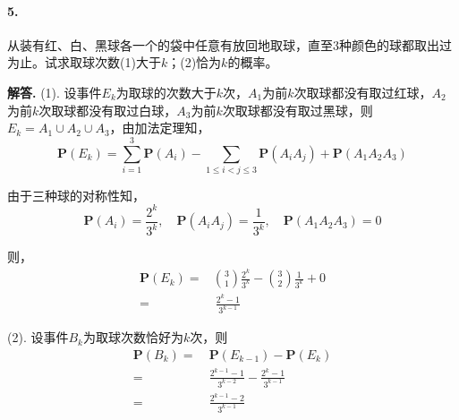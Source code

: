 \documentclass[12pt, a4paper, oneside]{ctexart}
\newenvironment{solution}{\par\noindent\textbf{解答. }}{\bigskip\par}
\begin{document}
\paragraph{5.}从装有红、白、黑球各一个的袋中任意有放回地取球，直至$3$种颜色的球都取出过为止。试求取球次数(1)大于$k$；(2)恰为$k$的概率。
\begin{solution}
    (1). 设事件$E_k$为取球的次数大于$k$次，$A_1$为前$k$次取球都没有取过红球，$A_2$为前$k$次取球都没有取过白球，$A_3$为前$k$次取球都没有取过黑球，则$E_k = A_1\cup A_2\cup A_3$，由加法定理知，
    \begin{equation*}
        \textbf{P}(E_k) = \sum_{i=1}^3\textbf{P}(A_i)-\sum_{1\leqslant i < j \leqslant 3}\textbf{P}(A_iA_j) + \textbf{P}(A_1A_2A_3)
    \end{equation*}

    由于三种球的对称性知，
    \begin{equation*}
        \textbf{P}(A_i) = \frac{2^{k}}{3^{k}},\quad \textbf{P}(A_iA_j)=\frac{1}{3^{k}},\quad \textbf{P}(A_1A_2A_3) = 0
    \end{equation*}

    则，
    \begin{equation*}
        \begin{aligned}
            \textbf{P}(E_k) =& \binom{3}{1}\frac{2^{k}}{3^{k}}-\binom{3}{2}\frac{1}{3^{k}}+0\\
            =&\ \frac{2^{k}-1}{3^{k-1}}
        \end{aligned}
    \end{equation*}

    (2). 设事件$B_k$为取球次数恰好为$k$次，则
    \begin{equation*}
        \begin{aligned}
            \textbf{P}(B_k) =&\ \textbf{P}(E_{k-1})-\textbf{P}(E_k)\\
            =&\ \frac{2^{k-1}-1}{3^{k-2}}-\frac{2^{k}-1}{3^{k-1}}\\
            =&\ \frac{2^{k-1}-2}{3^{k-1}}
        \end{aligned}
    \end{equation*}
\end{solution}
\end{document}
